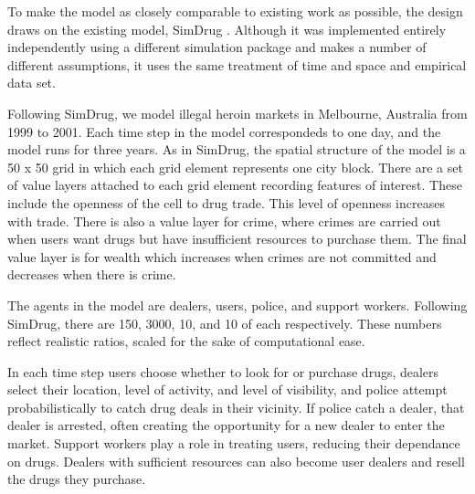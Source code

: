 \documentclass[runningheads,a4paper]{llncs}
\begin{document}
To make the model as closely comparable to existing work as possible, the design draws on the existing model, SimDrug \cite{dray_policing_2008}. Although it was implemented entirely independently using a different simulation package and makes a number of different assumptions, it uses the same treatment of time and space and empirical data set.


Following SimDrug, we model illegal heroin markets in Melbourne, Australia from 1999 to 2001. Each time step in the model correspondeds to one day, and the model runs for three years. As in SimDrug, the spatial structure of the model is a 50 x 50 grid in which each grid element represents one city block. There are a set of value layers attached to each grid element recording features of interest. These include the openness of the cell to drug trade. This level of openness increases with trade. There is also a value layer for crime, where crimes are carried out when users want drugs but have insufficient resources to purchase them. The final value layer is for wealth which increases when crimes are not committed and decreases when there is crime.

The agents in the model are dealers, users, police, and support workers. Following SimDrug, there are 150, 3000, 10, and 10 of each respectively. These numbers reflect realistic ratios, scaled for the sake of computational ease.

In each time step users choose whether to look for or purchase drugs, dealers select their location, level of activity, and level of visibility, and police attempt probabilistically to catch drug deals in their vicinity. If police catch a dealer, that dealer is arrested, often creating the opportunity for a new dealer to enter the market. Support workers play a role in treating users, reducing their dependance on drugs. Dealers with sufficient resources can also become user dealers and resell the drugs they purchase.


\end{document}
